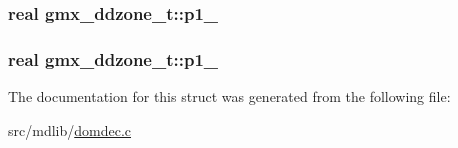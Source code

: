 \hypertarget{structgmx__ddzone__t_a497638cb47e921b32a5bb9c9adba98ff}{
\subsubsection[{p1\-\_\-0}]{\setlength{\rightskip}{0pt plus 5cm}real {\bf gmx\-\_\-ddzone\-\_\-t\-::p1\-\_}}}\label{structgmx__ddzone__t_a497638cb47e921b32a5bb9c9adba98ff}
\hypertarget{structgmx__ddzone__t_a6889da4eefb96b9c303a24382354d104}{
\subsubsection[{p1\-\_\-1}]{\setlength{\rightskip}{0pt plus 5cm}real {\bf gmx\-\_\-ddzone\-\_\-t\-::p1\-\_}}}\label{structgmx__ddzone__t_a6889da4eefb96b9c303a24382354d104}


\-The documentation for this struct was generated from the following file\-:\begin{DoxyCompactItemize}
\item 
src/mdlib/\hyperlink{domdec_8c}{domdec.\-c}\end{DoxyCompactItemize}
